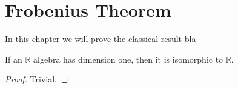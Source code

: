 \chapter{Frobenius Theorem}

In this chapter we will prove the classical result bla

\begin{lemma}
    If an $\mathbb{R}$ algebra has dimension one, then it is isomorphic to $\mathbb{R}$.
    \leanok
\end{lemma}
\begin{proof}
    Trivial.
\end{proof}